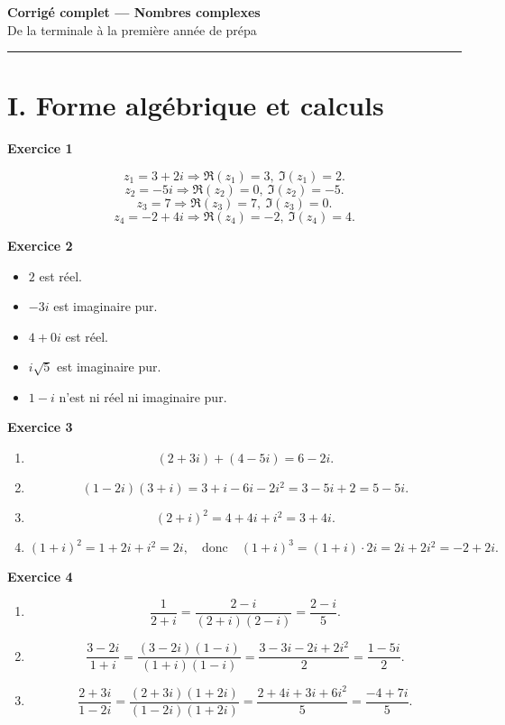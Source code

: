 \documentclass[11pt,a4paper]{article}
\begin{document}
\begin{center}
    {\LARGE \textbf{Corrigé complet --- Nombres complexes}}\\[0.3em]
    {\large De la terminale à la première année de prépa}
\end{center}

\hrule
\vspace{0.8em}

\tableofcontents

\newpage

\section*{I. Forme algébrique et calculs}

\textbf{Exercice 1}

\[
z_1=3+2i \Rightarrow \Re(z_1)=3,\ \Im(z_1)=2.
\]
\[
z_2=-5i \Rightarrow \Re(z_2)=0,\ \Im(z_2)=-5.
\]
\[
z_3=7 \Rightarrow \Re(z_3)=7,\ \Im(z_3)=0.
\]
\[
z_4=-2+4i \Rightarrow \Re(z_4)=-2,\ \Im(z_4)=4.
\]

\textbf{Exercice 2}

\begin{itemize}
    \item \(2\) est réel.
    \item \(-3i\) est imaginaire pur.
    \item \(4+0i\) est réel.
    \item \(i\sqrt{5}\) est imaginaire pur.
    \item \(1-i\) n’est ni réel ni imaginaire pur.
\end{itemize}

\textbf{Exercice 3}

\begin{enumerate}[label=\alph*)]
    \item
    \[
    (2+3i)+(4-5i)=6-2i.
    \]

    \item
    \[
    (1-2i)(3+i)=3+i-6i-2i^2=3-5i+2=5-5i.
    \]

    \item
    \[
    (2+i)^2=4+4i+i^2=3+4i.
    \]

    \item
    \[
    (1+i)^2=1+2i+i^2=2i,
    \quad \text{donc} \quad
    (1+i)^3=(1+i)\cdot 2i=2i+2i^2=-2+2i.
    \]
\end{enumerate}

\textbf{Exercice 4}

\begin{enumerate}[label=\alph*)]
    \item
    \[
    \frac{1}{2+i}=\frac{2-i}{(2+i)(2-i)}=\frac{2-i}{5}.
    \]

    \item
    \[
    \frac{3-2i}{1+i}
    =\frac{(3-2i)(1-i)}{(1+i)(1-i)}
    =\frac{3-3i-2i+2i^2}{2}
    =\frac{1-5i}{2}.
    \]

    \item
    \[
    \frac{2+3i}{1-2i}
    =\frac{(2+3i)(1+2i)}{(1-2i)(1+2i)}
    =\frac{2+4i+3i+6i^2}{5}
    =\frac{-4+7i}{5}.
    \]
\end{enumerate}
\end{document}
